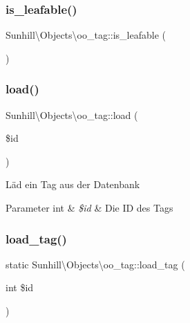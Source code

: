 \subsubsection{\texorpdfstring{is\+\_\+leafable()}{is\_leafable()}}
{\footnotesize\ttfamily Sunhill\textbackslash{}\+Objects\textbackslash{}oo\+\_\+tag\+::is\+\_\+leafable (\begin{DoxyParamCaption}{ }\end{DoxyParamCaption})}

\mbox{\label{classSunhill_1_1Objects_1_1oo__tag_aee2ca422c8af3b677383bbe15655b0e0}} 
\subsubsection{\texorpdfstring{load()}{load()}}
{\footnotesize\ttfamily Sunhill\textbackslash{}\+Objects\textbackslash{}oo\+\_\+tag\+::load (\begin{DoxyParamCaption}\item[{}]{\$id }\end{DoxyParamCaption})}

Läd ein Tag aus der Datenbank 
\begin{DoxyParams}[1]{Parameter}
int & {\em \$id} & Die ID des Tags \\
\hline
\end{DoxyParams}
\mbox{\label{classSunhill_1_1Objects_1_1oo__tag_af4c42f6c5a1e0fe0c19878b1cd836929}} 
\subsubsection{\texorpdfstring{load\+\_\+tag()}{load\_tag()}}
{\footnotesize\ttfamily static Sunhill\textbackslash{}\+Objects\textbackslash{}oo\+\_\+tag\+::load\+\_\+tag (\begin{DoxyParamCaption}\item[{int}]{\$id }\end{DoxyParamCaption})\hspace{0.3cm}{\ttfamily [static]}}

